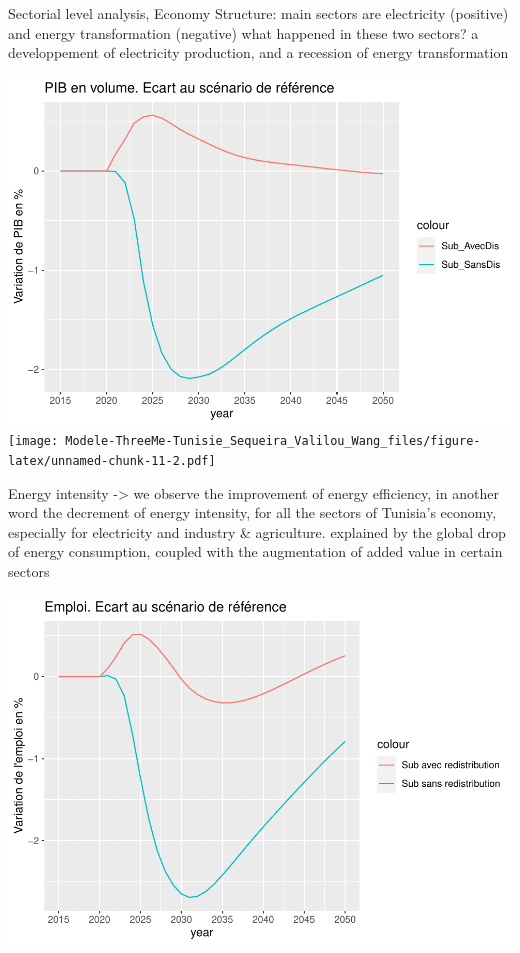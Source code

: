 \documentclass[
]{article}
\begin{document}
Sectorial level analysis, Economy Structure: main sectors are
electricity (positive) and energy transformation (negative) what
happened in these two sectors? a developpement of electricity
production, and a recession of energy transformation

\includegraphics{Modele-ThreeMe-Tunisie_Sequeira_Valilou_Wang_files/figure-latex/unnamed-chunk-11-1.pdf}
\texttt{[image: Modele-ThreeMe-Tunisie\_Sequeira\_Valilou\_Wang\_files/figure-latex/unnamed-chunk-11-2.pdf]}

Energy intensity -\textgreater{} we observe the improvement of energy
efficiency, in another word the decrement of energy intensity, for all
the sectors of Tunisia's economy, especially for electricity and
industry \& agriculture. explained by the global drop of energy
consumption, coupled with the augmentation of added value in certain
sectors

\includegraphics{Modele-ThreeMe-Tunisie_Sequeira_Valilou_Wang_files/figure-latex/unnamed-chunk-12-1.pdf}
\end{document}
